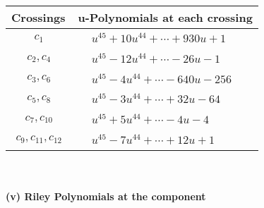 \documentclass[1p]{elsarticle_modified}
\theoremstyle{definition}
\begin{document}
\begin{tabular}{m{50pt}|m{274pt}}
Crossings & \hspace{64pt}u-Polynomials at each crossing \\
\hline $$\begin{aligned}c_{1}\end{aligned}$$&$\begin{aligned}
&u^{45}+10 u^{44}+\cdots+930 u+1
\end{aligned}$\\
\hline $$\begin{aligned}c_{2},c_{4}\end{aligned}$$&$\begin{aligned}
&u^{45}-12 u^{44}+\cdots-26 u-1
\end{aligned}$\\
\hline $$\begin{aligned}c_{3},c_{6}\end{aligned}$$&$\begin{aligned}
&u^{45}-4 u^{44}+\cdots-640 u-256
\end{aligned}$\\
\hline $$\begin{aligned}c_{5},c_{8}\end{aligned}$$&$\begin{aligned}
&u^{45}-3 u^{44}+\cdots+32 u-64
\end{aligned}$\\
\hline $$\begin{aligned}c_{7},c_{10}\end{aligned}$$&$\begin{aligned}
&u^{45}+5 u^{44}+\cdots-4 u-4
\end{aligned}$\\
\hline $$\begin{aligned}c_{9},c_{11},c_{12}\end{aligned}$$&$\begin{aligned}
&u^{45}-7 u^{44}+\cdots+12 u+1
\end{aligned}$\\
\hline
\end{tabular}\\~\\
\newpage\renewcommand{\arraystretch}{1}
\flushleft \textbf{(v) Riley Polynomials at the component}\newline \\
\end{document}

